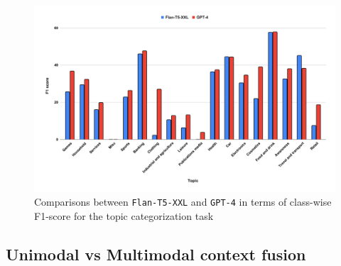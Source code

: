 \begin{figure}[h!]
    \includegraphics[width=\textwidth]{figures/gpt_4_flan_t5_xxl_topic.pdf}
    \caption{Comparisons between \texttt{Flan-T5-XXL} and \texttt{GPT-4} in terms of class-wise F1-score for the topic categorization task}
    \label{gpt_4_flan_t5_xxl_topic}
\end{figure}


\subsection{Unimodal vs Multimodal context fusion}

